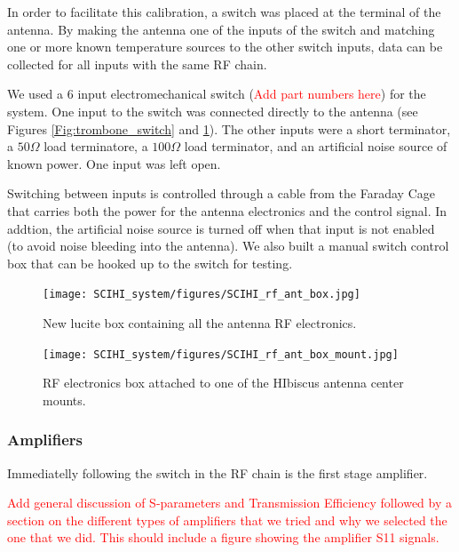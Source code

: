 In order to facilitate this calibration, a switch was placed at the terminal of the antenna. By making the antenna one of the inputs of the switch and matching one or more known temperature sources to the other switch inputs, data can be collected for all inputs with the same RF chain. 

We used a 6 input electromechanical switch (\textcolor{red}{Add part numbers here}) for the system. One input to the switch was connected directly to the antenna (see Figures \ref{Fig:trombone_switch} and \ref{Fig:rf_ant_mount}). The other inputs were a short terminator, a $50 \Omega$ load terminatore, a $100 \Omega$ load terminator, and an artificial noise source of known power. One input was left open. 

Switching between inputs is controlled through a cable from the Faraday Cage that carries both the power for the antenna electronics and the control signal. In addtion, the artificial noise source is turned off when that input is not enabled (to avoid noise bleeding into the antenna). We also built a manual switch control box that can be hooked up to the switch for testing. 

\begin{figure}[htb]
\centering
\begin{minipage}[b]{0.47\textwidth}
\centering
\texttt{[image: SCIHI\_system/figures/SCIHI\_rf\_ant\_box.jpg]}
\caption{New lucite box containing all the antenna RF electronics.}
\label{Fig:rf_ant_box}
\end{minipage}%
\begin{minipage}[b]{0.02\textwidth}
\hspace{1cm}
\end{minipage}%
\begin{minipage}[b]{0.47\textwidth}
\centering
\texttt{[image: SCIHI\_system/figures/SCIHI\_rf\_ant\_box\_mount.jpg]}
\caption{RF electronics box attached to one of the HIbiscus antenna center mounts.}
\label{Fig:rf_ant_mount}
\end{minipage}
\end{figure}

\subsubsection{Amplifiers}
Immediatelly following the switch in the RF chain is the first stage amplifier. 

\textcolor{red}{Add general discussion of S-parameters and Transmission Efficiency followed by a section on the different types of amplifiers that we tried and why we selected the one that we did. This should include a figure showing the amplifier S11 signals.}

